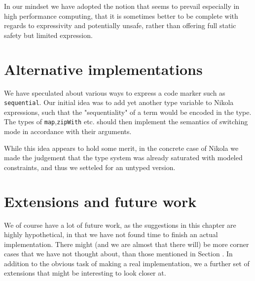 In our mindset we have adopted the notion that seems to prevail especially in
high performance computing, that it is sometimes better to be complete with
regards to expressivity and potentially unsafe, rather than offering full
static safety but limited expression.


\section{Alternative implementations}

We have speculated about various ways to express a code marker such as
\lstinline{sequential}. Our initial idea was to add yet another type variable
to Nikola expressions, such that the "sequentiality" of a term would be encoded
in the type. The types of \lstinline{map},\lstinline{zipWith} etc. should
then implement the semantics of switching mode in accordance with their
arguments.

While this idea appears to hold some merit, in the concrete case of Nikola we
made the judgement that the type system was already saturated with modeled
constraints, and thus we setteled for an untyped version.

\section{Extensions and future work}
\label{sec:parallelism-future-work}

We of course have a lot of future work, as the suggestions in this
chapter are highly hypothetical, in that we have not found time to
finish an actual implementation. There might (and we are almost that
there will) be more corner cases that we have not thought about, than
those mentioned in Section . In addition to the obvious task
of making a real implementation, we a further set of extensions that
might be interesting to look closer at.

